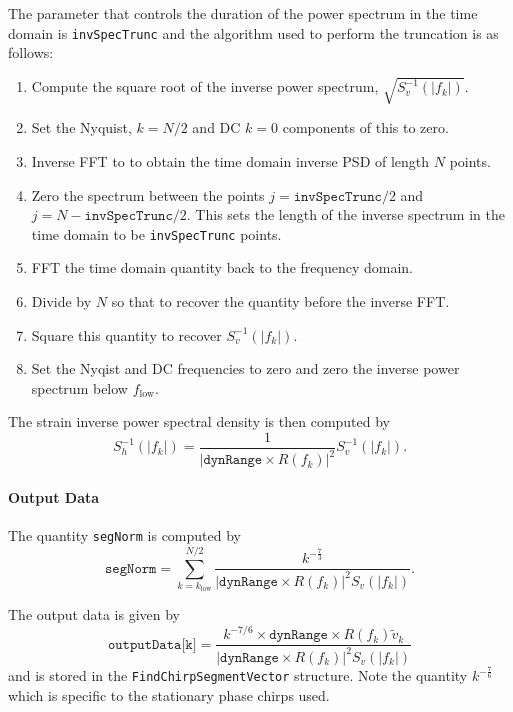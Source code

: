 The parameter that controls the duration of the power spectrum in the time
domain is \texttt{invSpecTrunc} and the algorithm used to perform the
truncation is as follows:
\begin{enumerate}
\item Compute the square root of the inverse power spectrum,
$\sqrt{S^{-1}_v(|f_k|)}$.
\item Set the Nyquist, $k = N/2$ and DC $k = 0$ components of this to zero.
\item Inverse FFT to to obtain the time domain inverse PSD of length $N$
points.
\item Zero the spectrum between the points $j = \texttt{invSpecTrunc}/2$ and 
$j = N - \texttt{invSpecTrunc}/2$. This sets the length of the inverse
spectrum in the time domain to be \texttt{invSpecTrunc} points.
\item FFT the time domain quantity back to the frequency domain.
\item Divide by $N$ so that to recover the quantity before the inverse FFT.
\item Square this quantity to recover $S^{-1}_v(|f_k|)$.
\item Set the Nyqist and DC frequencies to zero and zero the inverse power
spectrum below $f_{\textrm{low}}$.
\end{enumerate}

The strain inverse power spectral density is then computed by
\begin{equation}
S^{-1}_h(|f_k|) = \frac{1}{\left|\texttt{dynRange} \times R(f_k)\right|^2}
 S^{-1}_v(|f_k|).
\end{equation}

\paragraph*{Output Data}
The quantity \texttt{segNorm} is computed by
\begin{equation}
\texttt{segNorm} = 
   \sum_{k = k_{\textrm{low}}}^{N/2} \frac{k^{-\frac{7}{3}}}
   {\left|\texttt{dynRange}\times R(f_k)\right|^2 S_v(|f_k|)}.
\end{equation}

The output data is given by
\begin{equation}
\texttt{outputData[k]} = 
\frac{k^{-7/6} \times \texttt{dynRange} \times R(f_k)\tilde{v}_k}
{\left|\texttt{dynRange} \times R(f_k)\right|^2 S_v(|f_k|)}
\end{equation}
and is stored in the \texttt{FindChirpSegmentVector} structure. Note the
quantity $k^{-\frac{7}{6}}$ which is specific to the stationary phase chirps
used.

